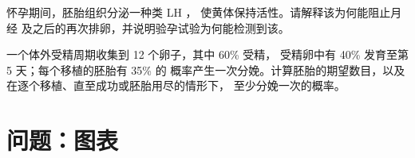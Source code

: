 \begin{exercise}[$\star\star\star$]\label{exo:g11:hormones-and-reproduction:14}
怀孕期间，胚胎组织分泌一种类 LH ，
使黄体保持活性。请解释该为何能阻止月经
及之后的再次排卵，并说明验孕试验为何能检测到该。
\end{exercise}

\begin{exercise}[$\star\star\star$]\label{exo:g11:hormones-and-reproduction:15}
一个体外受精周期收集到 12 个卵子，其中 60\% 受精，
受精卵中有 40\% 发育至第 5 天；每个移植的胚胎有 35\% 的
概率产生一次分娩。计算胚胎的期望数目，以及
在逐个移植、直至成功或胚胎用尽的情形下，
至少分娩一次的概率。
\end{exercise}

\section{问题：图表}


